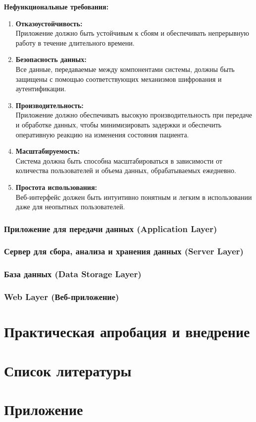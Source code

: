 \documentclass[12pt, russian]{extarticle}
\begin{document}
\begin{spacing}{1.5}
\noindent
\textbf{Нефункциональные требования:}

\begin{enumerate}
    \item \textbf{Отказоустойчивость:} \\
        Приложение должно быть устойчивым к сбоям и обеспечивать непрерывную работу в течение длительного времени.
    \item \textbf{Безопасность данных:} \\
        Все данные, передаваемые между компонентами системы, должны быть защищены с помощью соответствующих механизмов шифрования и аутентификации.
    \item \textbf{Производительность:} \\
        Приложение должно обеспечивать высокую производительность при передаче и обработке данных, чтобы минимизировать задержки и обеспечить оперативную реакцию на изменения состояния пациента.
    \item \textbf{Масштабируемость:} \\
        Система должна быть способна масштабироваться в зависимости от количества пользователей и объема данных, обрабатываемых ежедневно.
    \item \textbf{Простота использования:} \\
        Веб-интерфейс должен быть интуитивно понятным и легким в использовании даже для неопытных пользователей.
\end{enumerate}

\subsubsection{Приложение для передачи данных (Application Layer)}
\subsubsection{Сервер для сбора, анализа и хранения данных (Server Layer)}
\subsubsection{База данных (Data Storage Layer)}
\subsubsection{Web Layer (Веб-приложение)}
\newpage
\section{Практическая апробация и внедрение}

\newpage
\section{Список литературы}


\newpage
\section{Приложение}

\end{spacing}
\end{document}
